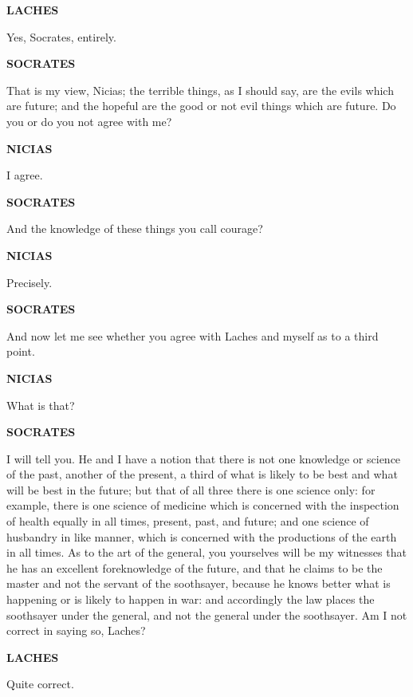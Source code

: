 \documentclass[11pt,letter]{book}
\begin{document}
\par \textbf{LACHES}
\par   Yes, Socrates, entirely.

\par \textbf{SOCRATES}
\par   That is my view, Nicias; the terrible things, as I should say, are the evils which are future; and the hopeful are the good or not evil things which are future. Do you or do you not agree with me?

\par \textbf{NICIAS}
\par   I agree.

\par \textbf{SOCRATES}
\par   And the knowledge of these things you call courage?

\par \textbf{NICIAS}
\par   Precisely.

\par \textbf{SOCRATES}
\par   And now let me see whether you agree with Laches and myself as to a third point.

\par \textbf{NICIAS}
\par   What is that?

\par \textbf{SOCRATES}
\par   I will tell you. He and I have a notion that there is not one knowledge or science of the past, another of the present, a third of what is likely to be best and what will be best in the future; but that of all three there is one science only:  for example, there is one science of medicine which is concerned with the inspection of health equally in all times, present, past, and future; and one science of husbandry in like manner, which is concerned with the productions of the earth in all times. As to the art of the general, you yourselves will be my witnesses that he has an excellent foreknowledge of the future, and that he claims to be the master and not the servant of the soothsayer, because he knows better what is happening or is likely to happen in war:  and accordingly the law places the soothsayer under the general, and not the general under the soothsayer. Am I not correct in saying so, Laches?

\par \textbf{LACHES}
\par   Quite correct.
\end{document}
